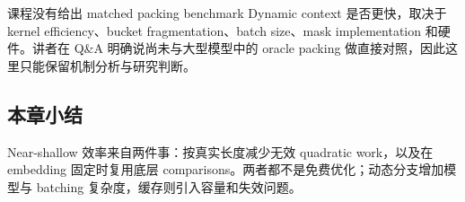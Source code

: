 
\begin{warningbox}{课程没有给出 matched packing benchmark}
Dynamic context 是否更快，取决于 kernel efficiency、bucket fragmentation、batch size、mask implementation 和硬件。讲者在 Q\&A 明确说尚未与大型模型中的 oracle packing 做直接对照，因此这里只能保留机制分析与研究判断。
\end{warningbox}



\subsection{本章小结}

Near-shallow 效率来自两件事：按真实长度减少无效 quadratic work，以及在 embedding 固定时复用底层 comparisons。两者都不是免费优化；动态分支增加模型与 batching 复杂度，缓存则引入容量和失效问题。

